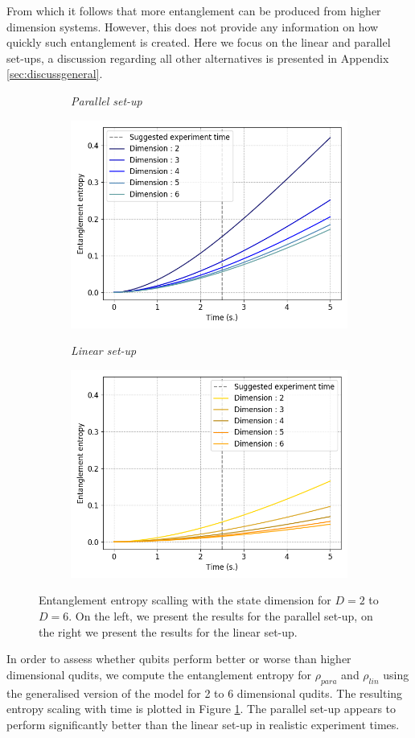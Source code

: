\documentclass[%
 12pt,
 superscriptaddress,
 amsmath,
 amssymb,
 onecolumn,
 longbibliography
]{revtex4-2}
\begin{document}
From which it follows that more entanglement can be produced from higher dimension systems. However, this does not provide any information on how quickly such entanglement is created. Here we focus on the linear and parallel set-ups, a discussion regarding all other alternatives is presented in Appendix \ref{sec:discussgeneral}. \\
	\begin{figure}
	    \begin{subfigure}{.49\textwidth}
	        \textit{Parallel set-up}\par\medskip
    		\includegraphics[width=.5\columnwidth]{para_qudits.png}\par\medskip
		\end{subfigure}
	    \begin{subfigure}{.49\textwidth}
	        \textit{Linear set-up}\par\medskip
    		\includegraphics[width=.5\columnwidth]{linear_qudits.png}\par\medskip
		\end{subfigure}
		\caption{Entanglement entropy scalling with the state dimension for $D=2$ to $D=6$. On the left, we present the results for the parallel set-up, on the right we present the results for the linear set-up.} \label{para_qudits}
	\end{figure}
\indent In order to assess whether qubits perform better or worse than higher dimensional qudits, we compute the entanglement entropy for $\rho_{para}$ and $\rho_{lin}$ using the generalised version of the model for 2 to 6 dimensional qudits. The resulting entropy scaling with time is plotted in Figure \ref{para_qudits}. The parallel set-up appears to perform significantly better than the linear set-up in realistic experiment times. \\
\end{document}
